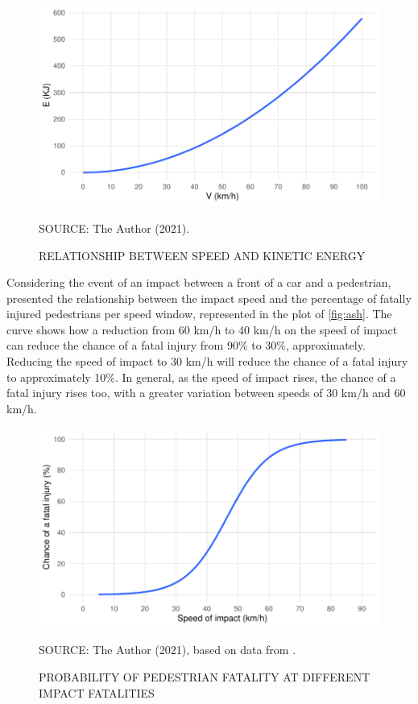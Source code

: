 \begin{figure}[!htbp]
    \centering\footnotesize
    \captionsetup{font=footnotesize}
    \caption{RELATIONSHIP BETWEEN SPEED AND KINETIC ENERGY}
    \includegraphics{fig/kinetic.pdf}
    \label{fig:kinetic}
    \par SOURCE: The Author (2021).
\end{figure}

Considering the event of an impact between a front of a car and a pedestrian, \textcite{Ashton1980} presented the relationship between the impact speed and the percentage of fatally injured pedestrians per speed window, represented in the plot of \autoref{fig:ash}. The curve shows how a reduction from 60 km/h to 40 km/h on the speed of impact can reduce the chance of a fatal injury from 90\% to 30\%, approximately. Reducing the speed of impact to 30 km/h will reduce the chance of a fatal injury to approximately 10\%. In general, as the speed of impact rises, the chance of a fatal injury rises too, with a greater variation between speeds of 30 km/h and 60 km/h. 

\begin{figure}[!htbp]
    \centering\footnotesize
    \captionsetup{font=footnotesize}
    \caption{PROBABILITY OF PEDESTRIAN FATALITY AT DIFFERENT IMPACT FATALITIES}
    \includegraphics{fig/ash.pdf}
    \label{fig:ash}
    \par SOURCE: The Author (2021), based on data from \textcite{Ashton1980}.
\end{figure}


